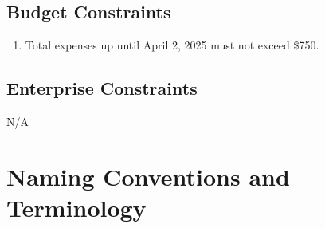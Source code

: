 \documentclass[12pt]{article}
\begin{document}
\subsection{Budget Constraints}
\begin{enumerate} [{C-BDG}1.]
  \item Total expenses up until April 2, 2025 must not exceed \$750.
\end{enumerate}

\subsection{Enterprise Constraints}
N/A

\section{Naming Conventions and Terminology}
\end{document}
